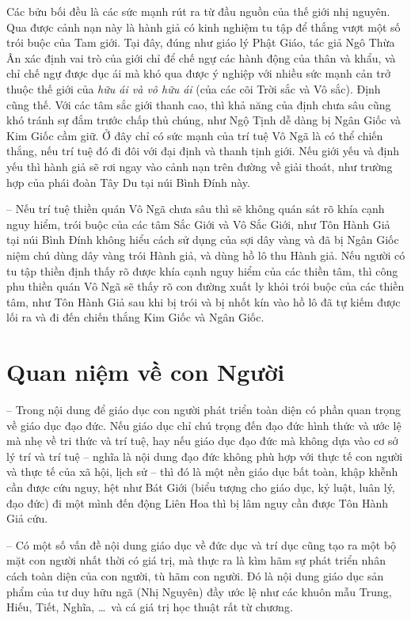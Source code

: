 Các bửu bối đều là các sức mạnh rút ra từ đầu nguồn của thế giới nhị nguyên. Qua được cảnh nạn này là hành giả có kinh nghiệm tu tập để thắng vượt một số trói buộc của Tam giới. Tại đây, đúng như giáo lý Phật Giáo, tác giả Ngô Thừa Ân xác định vai trò của giới chỉ để chế ngự các hành động của thân và khẩu, và chỉ chế ngự được dục ái mà khó qua được ý nghiệp với nhiều sức mạnh cản trở thuộc thế giới của \emph{hữu ái và vô hữu ái} (của các cõi Trời sắc và Vô sắc). Định cũng thế. Với các tâm sắc giới thanh cao, thì khả năng của định chưa sâu cũng khó tránh sự đắm trước chấp thủ chúng, như Ngộ Tịnh dễ dàng bị Ngân Giốc và Kim Giốc cầm giữ. Ở đây chỉ có sức mạnh của trí tuệ Vô Ngã là có thể chiến thắng, nếu trí tuệ đó đi đôi với đại định và thanh tịnh giới. Nếu giới yếu và định yếu thì hành giả sẽ rơi ngay vào cảnh nạn trên đường về giải thoát, như trường hợp của phái đoàn Tây Du tại núi Bình Đính này.

-- Nếu trí tuệ thiền quán Vô Ngã chưa sâu thì sẽ không quán sát rõ khía cạnh nguy hiểm, trói buộc của các tâm Sắc Giới và Vô Sắc Giới, như Tôn Hành Giả tại núi Bình Đính không hiểu cách sử dụng của sợi dây vàng và đã bị Ngân Giốc niệm chú dùng dây vàng trói Hành giả, và dùng hồ lô thu Hành giả. Nếu người có tu tập thiền định thấy rõ được khía cạnh nguy hiểm của các thiền tâm, thì công phu thiền quán Vô Ngã sẽ thấy rõ con đường xuất ly khỏi trói buộc của các thiền tâm, như Tôn Hành Giả sau khi bị trói và bị nhốt kín vào hồ lô đã tự kiếm được lối ra và đi đến chiến thắng Kim Giốc và Ngân Giốc.

\section{Quan niệm về con Người} %
\label{sec:33_34_con_nguoi}

-- Trong nội dung để giáo dục con người phát triển toàn diện có phần quan trọng về giáo dục đạo đức. Nếu giáo dục chỉ chú trọng đến đạo đức hình thức và ước lệ mà nhẹ về tri thức và trí tuệ, hay nếu giáo dục đạo đức mà không dựa vào cơ sở lý trí và trí tuệ -- nghĩa là nội dung đạo đức không phù hợp với thực tế con người và thực tế của xã hội, lịch sử -- thì đó là một nền giáo dục bất toàn, khập khễnh cần được cứu nguy, hệt như Bát Giới (biểu tượng cho giáo dục, kỷ luật, luân lý, đạo đức) đi một mình đến động Liên Hoa thì bị lâm nguy cần được Tôn Hành Giả cứu.

-- Có một số vấn đề nội dung giáo dục về đức dục và trí dục cũng tạo ra một bộ mặt con người nhất thời có giá trị, mà thực ra là kìm hãm sự phát triển nhân cách toàn diện của con người, tù hãm con người. Đó là nội dung giáo dục sản phẩm của tư duy hữu ngã (Nhị Nguyên) đầy ước lệ như các khuôn mẫu Trung, Hiếu, Tiết, Nghĩa, \ldots ~và cá giá trị học thuật rất từ chương.

